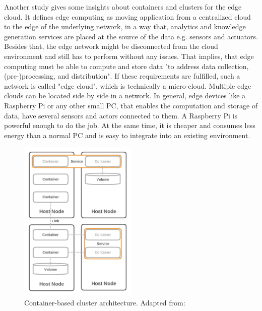 Another study \autocite{Pahl:2015} gives some insights about containers and clusters for the edge cloud.
It defines edge computing as moving application from a centralized cloud to the edge of the underlying network, in a way that, analytics and knowledge generation services are placed at the source of the data e.g. sensors and actuators.\autocite[cf.][p. 380]{Pahl:2015}
Besides that, the edge network might be disconnected from the cloud environment and still has to perform without any issues.
That implies, that edge computing must be able to compute and store data "to address data collection, (pre-)processing, and distribution"\autocite[p. 380]{Pahl:2015}.
If these requirements are fulfilled, such a network is called "edge cloud", which is technically a micro-cloud.\autocite[cf.][p. 121]{Pahl:2016}
Multiple edge clouds can be located side by side in a network.
In general, edge devices like a Raspberry Pi or any other small \ac{PC}, that enables the computation and storage of data, have several sensors and actors connected to them.
A Raspberry Pi is powerful enough to do the job.
At the same time, it is cheaper and consumes less energy than a normal \ac{PC} and is easy to integrate into an existing environment.\autocite[cf.][p. 118]{Pahl:2016}

\begin{figure}[H]
    \centering
    \includegraphics[width=0.5\textwidth]{resources/images/container_based_cluster_architecture.png}
    \caption[Container-based cluster architecture]{Container-based cluster architecture. Adapted from: \autocite[p. 384]{Pahl:2015}}
    \label{fig:container_based_cluster_architecture}
\end{figure}

